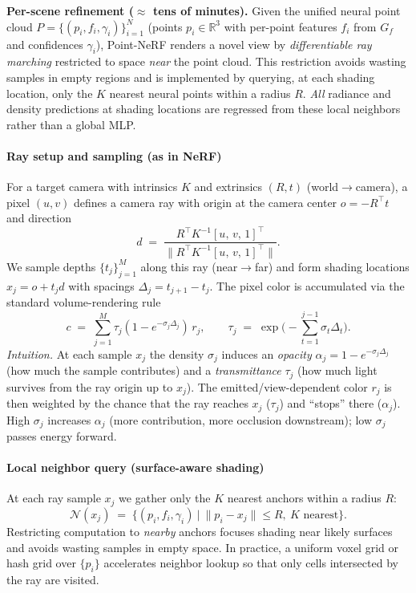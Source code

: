 \begin{enrichment}
\begin{enrichment}
\begin{enrichment}
        \medskip\noindent
        \textbf{Per-scene refinement ($\approx$ tens of minutes).}
        Given the unified neural point cloud $P=\{(p_i,f_i,\gamma_i)\}_{i=1}^N$ (points $p_i\!\in\!\mathbb{R}^3$ with per-point features $f_i$ from $G_f$ and confidences $\gamma_i$), Point-NeRF renders a novel view by \emph{differentiable ray marching} restricted to space \emph{near} the point cloud. This restriction avoids wasting samples in empty regions and is implemented by querying, at each shading location, only the $K$ nearest neural points within a radius $R$. \emph{All} radiance and density predictions at shading locations are regressed from these local neighbors rather than a global MLP. 
        
        \paragraph{Ray setup and sampling (as in NeRF)}
        For a target camera with intrinsics $K$ and extrinsics $(R,t)$ (world$\to$camera), a pixel $(u,v)$ defines a camera ray with origin at the camera center $o=-R^{\!\top}t$ and direction
        \[
        d \;=\; \frac{R^{\!\top}K^{-1}[u,\,v,\,1]^\top}{\big\|R^{\!\top}K^{-1}[u,\,v,\,1]^\top\big\|}.
        \]
        We sample depths $\{t_j\}_{j=1}^{M}$ along this ray (near$\to$far) and form shading locations $x_j=o+t_j d$ with spacings $\Delta_j=t_{j+1}-t_j$. The pixel color is accumulated via the standard volume-rendering rule
        \[
        c \;=\; \sum_{j=1}^{M}\tau_j\!\left(1-e^{-\sigma_j\Delta_j}\right)\, r_j,
        \qquad
        \tau_j \;=\; \exp\!\Big(-\sum_{t=1}^{j-1}\sigma_t\Delta_t\Big).
        \]
        \emph{Intuition.} At each sample $x_j$ the density $\sigma_j$ induces an \emph{opacity} $\alpha_j=1-e^{-\sigma_j\Delta_j}$ (how much the sample contributes) and a \emph{transmittance} $\tau_j$ (how much light survives from the ray origin up to $x_j$). The emitted/view-dependent color $r_j$ is then weighted by the chance that the ray reaches $x_j$ ($\tau_j$) and “stops” there ($\alpha_j$). High $\sigma_j$ increases $\alpha_j$ (more contribution, more occlusion downstream); low $\sigma_j$ passes energy forward.
        
        \paragraph{Local neighbor query (surface-aware shading)}
        At each ray sample $x_j$ we gather only the $K$ nearest anchors within a radius $R$:
        \[
        \mathcal{N}(x_j)\;=\;\Big\{(p_i,f_i,\gamma_i)\ \Big|\ \|p_i-x_j\|\le R,\ \text{$K$ nearest}\Big\}.
        \]
        Restricting computation to \emph{nearby} anchors focuses shading near likely surfaces and avoids wasting samples in empty space. In practice, a uniform voxel grid or hash grid over $\{p_i\}$ accelerates neighbor lookup so that only cells intersected by the ray are visited.
        

\end{enrichment}
\end{enrichment}
\end{enrichment}
